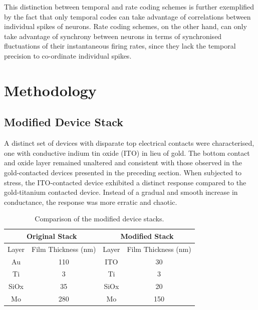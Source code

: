 \noindent This distinction between temporal and rate coding schemes is further exemplified by the fact that only temporal codes can take advantage of correlations between individual spikes of neurons. Rate coding schemes, on the other hand, can only take advantage of synchrony between neurons in terms of synchronised fluctuations of their instantaneous firing rates, since they lack the temporal precision to co-ordinate individual spikes.

\section[Methodology]{Methodology}

\subsection[Modified Device Stack]{Modified Device Stack}

A distinct set of devices with disparate top electrical contacts were characterised, one with conductive indium tin oxide (ITO) in lieu of gold. The bottom contact and oxide layer remained unaltered and consistent with those observed in the gold-contacted devices presented in the preceding section. When subjected to stress, the ITO-contacted device exhibited a distinct response compared to the gold-titanium contacted device. Instead of a gradual and smooth increase in conductance, the response was more erratic and chaotic. \\

\begin{table}[h]
\caption{Comparison of the modified device stacks.}
\centering
\begin{tabular}{|cc|cc|}
\hline
\multicolumn{2}{|c|}{Original Stack}              & \multicolumn{2}{c|}{Modified Stack}              \\ \hline
\multicolumn{1}{|c|}{Layer} & Film Thickness (nm) & \multicolumn{1}{c|}{Layer} & Film Thickness (nm) \\ \hline
\multicolumn{1}{|c|}{Au}    & 110                 & \multicolumn{1}{c|}{ITO}   & 30                  \\ \hline
\multicolumn{1}{|c|}{Ti}    & 3                   & \multicolumn{1}{c|}{Ti}    & 3                   \\ \hline
\multicolumn{1}{|c|}{SiOx}  & 35                  & \multicolumn{1}{c|}{SiOx}  & 20                  \\ \hline
\multicolumn{1}{|c|}{Mo}    & 280                 & \multicolumn{1}{c|}{Mo}    & 150                 \\ \hline
\end{tabular}
\end{table}

